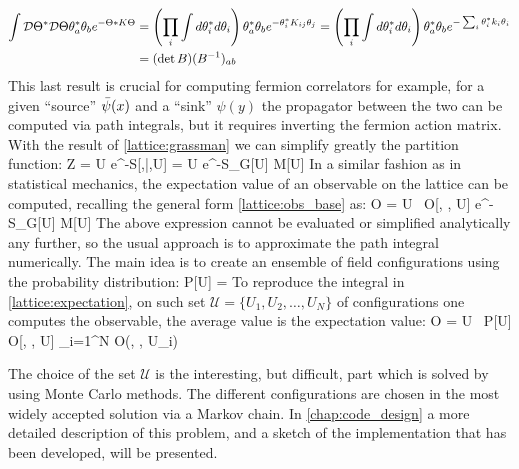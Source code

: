 \begin{align}
    \int \mathcal{D}\Theta^*\mathcal{D}\Theta \theta_a^*\theta_b e^{-\Theta* K \Theta } &= \left( \prod_i\int d\theta_i^*d\theta_i \right) \theta_a^*\theta_b e^{-\theta_i^* K_{ij} \theta_j } =  \left( \prod_i\int d\theta_i^*d\theta_i \right) \theta_a^*\theta_b e^{-\sum_i\theta_i^* k_i \theta_i } \\\nonumber
    &=  (\det B ) (B^{-1})_{ab}
\end{align}
This last result is crucial for computing fermion correlators for example, for a given ``source'' $\bar{\psi}(x)$ and a ``sink'' $\psi(y)$ the propagator between the two can be computed via path integrals, but it requires inverting the fermion action matrix. \\
With the result of \cref{lattice:grassman} we can simplify greatly the partition function:
\beq
	Z = \int \D\psi\D\bpsi\D U e^{-S[\psi,\bar{\psi},U] }  = \int \D U e^{-S_G[U] } \det M[U] 
\eeq
In a similar fashion as in statistical mechanics, the expectation value of an observable on the lattice can be computed, recalling the general form \cref{lattice:obs_base} as:
\beq
    \langle O \rangle =   \int \D U ~O[\psi, \bpsi, U] e^{-S_G[U] } \det M[U] 
    \label{lattice:expectation}
\eeq
The above expression cannot be evaluated or simplified analytically any further, so the usual approach is to approximate the path integral numerically. The main idea is to create an ensemble of field configurations using the probability distribution:
\beq
    P[U] = 
\eeq 
To reproduce the integral in \cref{lattice:expectation}, on such set $\mathcal{U} = \{ U_1, U_2, \dots,U_N \}$ of configurations one computes the observable, the average value is the expectation value:
\beq
\langle O \rangle =  \int \D U~ P[U] O[\psi, \bpsi, U] \approx {} \sum_{i=1}^N O(\psi, \bpsi, U_i) 
\eeq

The choice of the set $\mathcal{U}$ is the interesting, but difficult, part which is solved by using Monte Carlo methods. The different configurations are chosen in the most widely accepted solution via a Markov chain. In \cref{chap:code_design} a more detailed description of this problem, and a sketch of the implementation that has been developed, will be presented.


